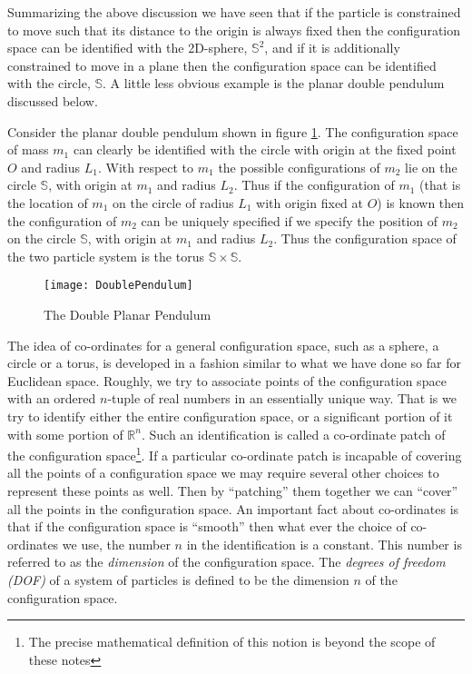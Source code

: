 \documentclass[graybox,envcountchap,sectrefs]{svmonoMuga}
\begin{document}
Summarizing the above discussion we have seen that if the particle is 
constrained to move such that its distance to the origin is always fixed then the configuration space can be identified with the 2D-sphere, $\mathbb{S}^2$, and if it is additionally constrained to move in a 
plane then the configuration space can be identified with the circle,  $\mathbb{S}$. A little less obvious example is the planar double pendulum discussed below.
\begin{example}
Consider the planar double pendulum shown in figure \ref{Fig:DoublePendulum0}.
The configuration space of mass $m_1$ can clearly be identified with the circle with origin at the fixed point $O$ and radius $L_1$. With respect to $m_1$ the possible configurations of 
$m_2$ lie on the circle  $\mathbb{S}$, with origin at $m_1$ and radius $L_2$. Thus if the configuration of $m_1$ (that is the location of $m_1$ on the circle of radius $L_1$ with origin fixed 
at $O$) is known then the configuration of $m_2$ can be uniquely specified if we specify the position of $m_2$ on the circle  $\mathbb{S}$, with origin at $m_1$ and radius $L_2$. Thus the 
configuration space of the two particle system is the torus $\mathbb{S}\times \mathbb{S}$.
\begin{figure}[ht]
\begin{center}
\texttt{[image: DoublePendulum]}
\renewcommand{\baselinestretch}{1}\selectfont
\caption{The Double Planar Pendulum}
\label{Fig:DoublePendulum0}
\renewcommand{\baselinestretch}{1.5}\selectfont
\end{center}
\end{figure}
\end{example}

The idea of co-ordinates for a general configuration space, such as a sphere, a circle or a torus, is developed in a fashion similar to what we have done so far for Euclidean space.
Roughly, we try to associate points of the configuration space with an ordered $n$-tuple of real numbers in an essentially unique way. That is we try to identify either the entire configuration 
space, or a significant portion of it with some portion of $\mathbb{R}^n$. Such an identification is called a co-ordinate patch of the configuration space\footnote{The precise 
mathematical definition of this notion is beyond the scope of these notes}.
If a particular co-ordinate patch is incapable of covering all the points of a configuration space we may require several other choices to represent these points as well. Then by 
``patching'' them together we can ``cover'' all the points in the configuration space.  An important fact about co-ordinates is that if the configuration space is ``smooth'' then what 
ever the choice of co-ordinates we use, the number $n$ in the identification is a constant. 
This number is referred to as the \textit{dimension} of the configuration space. The \textit{degrees of freedom (DOF)} of a system of particles is defined to be the dimension $n$ of the 
configuration space.
\end{document}
